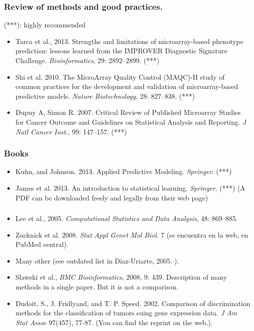 \begin{frame}
\frametitle{Review of methods and good practices.}

(***): highly recommended
\begin{itemize}
  
\item Tarca et al., 2013.   Strengths and limitations of microarray-based
  phenotype prediction: lessons learned from the IMPROVER Diagnostic
  Signature Challenge. \textit{Bioinformatics}, 29: 2892--2899. (***)
\item Shi et al. 2010. The MicroArray Quality Control (MAQC)-II study of
  common practices for the development and validation of microarray-based
  predictive models. \textit{Nature Biotechnology}, 28: 827--838. (***)

  
\item   Dupuy A, Simon R. 2007. Critical Review of Published Microarray Studies
  for Cancer Outcome and Guidelines on Statistical Analysis and
  Reporting. \textit{J Natl Cancer Inst.}, 99: 147--157.  (***)
\end{itemize}
\end{frame}


\begin{frame}
\frametitle{Books}
\begin{itemize}
  \item Kuhn, and Johnson. 2013. Applied Predictive
    Modeling. \textit{Springer}. (***)
  \item James et al. 2013. An introduction to statistical
    learning. \textit{Springer}. (***) {\footnotesize (A PDF can be downloaded freely and
    legally from their web page)}
\end{itemize}
\end{frame}



\begin{frame}
\frametitle{}
\begin{itemize}
  \item Lee et al., 2005. \textit{Computational Statistics and Data
    Analysis}, 48: 869--885.
  
\item Zucknick et al. 2008. \textit{Stat Appl Genet Mol Biol.} 7 (se
  encuentra en la web, en PubMed central). 

\item Many other (see outdated list in Diaz-Uriarte, 2005.
  ).
\item Slawski et al., \textit{BMC Bioinformatics}, 2008, 9:
  439. Description of many methods in a single paper. But it is not a comparison.

\item Dudoit, S., J. Fridlyand, and T. P. Speed. 2002.
    Comparison of discrimination methods for the classification of tumors suing gene expression data.
    \textit{J Am Stat Assoc} 97(457), 77-87. (You can find the reprint on
    the web.).

\end{itemize}
\end{frame}





